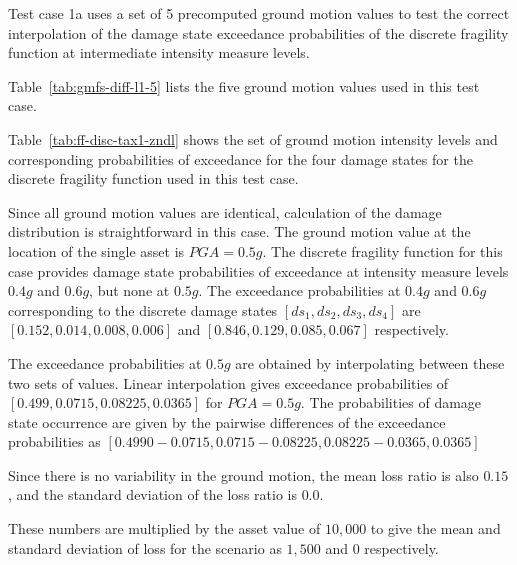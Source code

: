 Test case 1a uses a set of 5 precomputed ground motion values to test the correct interpolation of the damage state exceedance probabilities of the discrete fragility function at intermediate intensity measure levels.

Table~\ref{tab:gmfs-diff-l1-5} lists the five ground motion values used in this test case.



Table~\ref{tab:ff-disc-tax1-zndl} shows the set of ground motion intensity levels and corresponding probabilities of exceedance for the four damage states for the discrete fragility function used in this test case.

Since all ground motion values are identical, calculation of the damage distribution is straightforward in this case. The ground motion value at the location of the single asset is $PGA = 0.5 g$. The discrete fragility function for this case provides damage state probabilities of exceedance at intensity measure levels $0.4 g$ and $0.6 g$, but none at $0.5 g$. The exceedance probabilities at $0.4 g$ and $0.6 g$ corresponding to the discrete damage states $[ds_1, ds_2, ds_3, ds_4]$ are $[0.152, 0.014, 0.008, 0.006]$ and $[0.846, 0.129, 0.085, 0.067]$ respectively.

The exceedance probabilities at $0.5 g$ are obtained by interpolating between these two sets of values. Linear interpolation gives exceedance probabilities of $[0.499, 0.0715, 0.08225, 0.0365]$ for $PGA = 0.5 g$. The probabilities of damage state occurrence are given by the pairwise differences of the exceedance probabilities as $[0.4990 - 0.0715, 0.0715 - 0.08225, 0.08225 - 0.0365, 0.0365]$

Since there is no variability in the ground motion, the mean loss ratio is also $0.15$, and the standard deviation of the loss ratio is $0.0$.

These numbers are multiplied by the asset value of $10,000$ to give the mean and standard deviation of loss for the scenario as $1,500$ and $0$ respectively.